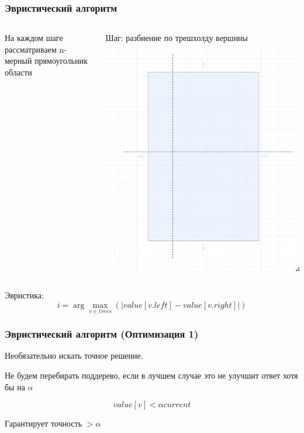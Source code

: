 \documentclass{beamer}
\begin{document}
\begin{frame} \frametitle{Эвристический алгоритм}

    \begin{columns}
            На каждом шаге рассматриваем n-мерный прямоугольник области

            Шаг: разбиение по трешхолду вершины
            \includegraphics[width=\textwidth]{split.png}
    \end{columns}
    \vfill
    \pause{}
    Эвристика:
    \[
        i = \arg \max_{v \in trees}(|value[v.left] - value[v.right]|)
    \]
\end{frame}

\begin{frame} \frametitle{Эвристический алгоритм (Оптимизация 1)}
    Необязательно искать точное решение.

    \vspace{50px}
    Не будем перебирать поддерево, если в лучшем случае это не улучшит ответ хотя бы на $\alpha$

    \[
        value[v] < \alpha current
    \]

    Гарантирует точность $>\alpha$
\end{frame}
\end{document}
